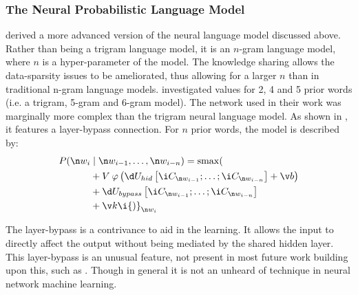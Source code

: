 {\subsubsection{The Neural Probabilistic Language Model}
 derived a more advanced version of the neural language model discussed above.
Rather than being a trigram language model, it is an $n$-gram language model, where $n$ is a hyper-parameter of the model.
The knowledge sharing allows the data-sparsity issues to be ameliorated, thus allowing for a larger $n$ than in traditional n-gram language models.
%
%
\textcite{NPLM} investigated values for 2, 4 and 5 prior words (i.e. a trigram, 5-gram and 6-gram model).
The network used in their work was marginally more complex than the trigram neural language model.
As shown in , it features a layer-bypass connection.
For $n$ prior words, the model is described by:
\begin{align}
P(\n w_i & \mid \n w_{i-1}, \ldots, \n w_{i-n}) = \softmax( \nonumber
\\  & + V \: \varphi\left( \d U_{hid} \left[\i C_{\n w_{i-1}};\ldots; \i C_{\n w_{i-n}} \right] + \v b\right) \nonumber
\\  & + \d U_{bypass} \left[ \i C_{\n w_{i-1}};\ldots; \i C_{\n w_{i-n}}\right] \nonumber
\\  & + \v k 
\i{)}_{\n w_i} %
\end{align}


The layer-bypass is a contrivance to aid in the learning.
It allows the input to directly affect the output without being mediated by the shared hidden layer.
This layer-bypass is an unusual feature, not present in most future work building upon this, such as .
Though in general it is not an unheard of technique in neural network machine learning.


}

